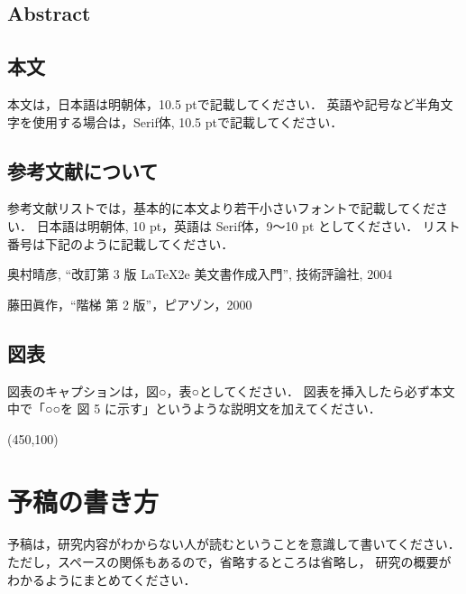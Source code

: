 \documentclass[titlepage]{jarticle}
\begin{document}
\subsection{Abstract}
%

%
%
\subsection{本文}
%
本文は，日本語は明朝体，10.5 ptで記載してください．
英語や記号など半角文字を使用する場合は，Serif体, 10.5 ptで記載してください．
%
%
\subsection{参考文献について}
%

参考文献リストでは，基本的に本文より若干小さいフォントで記載してください．
日本語は明朝体, 10 pt，英語は Serif体，9〜10 pt としてください．
リスト番号は下記のように記載してください．
%
\renewcommand{\labelenumi}{[\arabic{enumi}]}
\begin{enumerate}
  \small{
  \item 奥村晴彦, ``改訂第 3 版 \LaTeX2e 美文書作成入門'', 技術評論社, 2004
  \item 藤田眞作，``\LaTeXe 階梯 第 2 版''，ピアゾン，2000
        }
\end{enumerate}
\renewcommand{\labelenumi}{\arabic{enumi}}
%
%
%
\subsection{図表}
%
図表のキャプションは，図○，表○としてください．
図表を挿入したら必ず本文中で「○○を 図 5 に示す」というような説明文を加えてください．
%
\begin{table*}[t!]
  \centering
  \caption{○○}
  \framebox(450,100){}
  \label{tab:ex_tab1}
\end{table*}
%
%
%
\section{予稿の書き方}
%
予稿は，研究内容がわからない人が読むということを意識して書いてください．
ただし，スペースの関係もあるので，省略するところは省略し，
研究の概要がわかるようにまとめてください．
%
%
\end{document}
